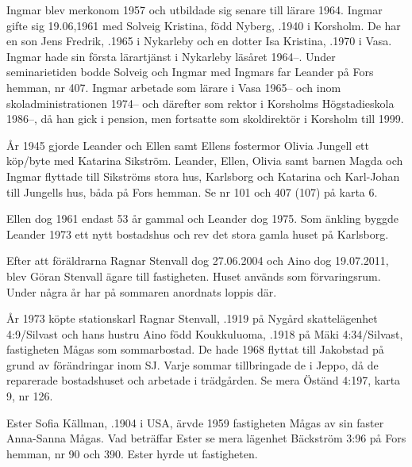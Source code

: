 Ingmar blev merkonom 1957 och utbildade sig senare till lärare 1964. Ingmar gifte sig 19.06,1961 med Solveig Kristina, född Nyberg, .1940 i Korsholm. De har en son Jens Fredrik, .1965 i Nykarleby och en dotter Isa Kristina, .1970 i Vasa. Ingmar hade sin första lärartjänst i Nykarleby läsåret 1964--. Under seminarietiden bodde Solveig och Ingmar med Ingmars far Leander på Fors hemman, nr 407. Ingmar arbetade som lärare i Vasa 1965-- och inom skoladministrationen 1974-- och därefter som rektor i Korsholms Högstadieskola 1986--, då han gick i pension, men fortsatte som skoldirektör i Korsholm till 1999.

År 1945 gjorde Leander och Ellen samt Ellens fostermor Olivia Jungell ett köp/byte med Katarina Sikström. Leander, Ellen, Olivia samt barnen Magda och Ingmar flyttade till Sikströms stora hus, Karlsborg och Katarina och Karl-Johan till Jungells hus, båda på Fors hemman. Se nr 101 och 407 (107) på karta 6.

Ellen dog 1961 endast 53 år gammal och Leander dog 1975. Som änkling byggde Leander 1973 ett nytt bostadshus och rev det stora gamla huset på Karlsborg.




Efter att föräldrarna Ragnar Stenvall dog 27.06.2004 och Aino	dog 19.07.2011, blev Göran Stenvall ägare till fastigheten. Huset används som förvaringsrum. Under några år har på sommaren anordnats loppis där.


År 1973 köpte stationskarl Ragnar Stenvall, .1919 på Nygård skattelägenhet 4:9/Silvast och hans hustru Aino född	Koukkuluoma, .1918 på Mäki 4:34/Silvast, fastigheten Mågas som sommarbostad. De hade 1968 flyttat till Jakobstad på grund av förändringar inom SJ. Varje sommar tillbringade de i Jeppo, då de reparerade bostadshuset och arbetade i trädgården. Se mera Öständ 4:197, karta 9, nr 126.


Ester Sofia Källman, .1904 i USA, ärvde 1959 fastigheten Mågas av sin faster Anna-Sanna Mågas. Vad beträffar Ester se mera lägenhet Bäckström 3:96 på Fors hemman, nr 90 och 390. Ester hyrde ut fastigheten.


